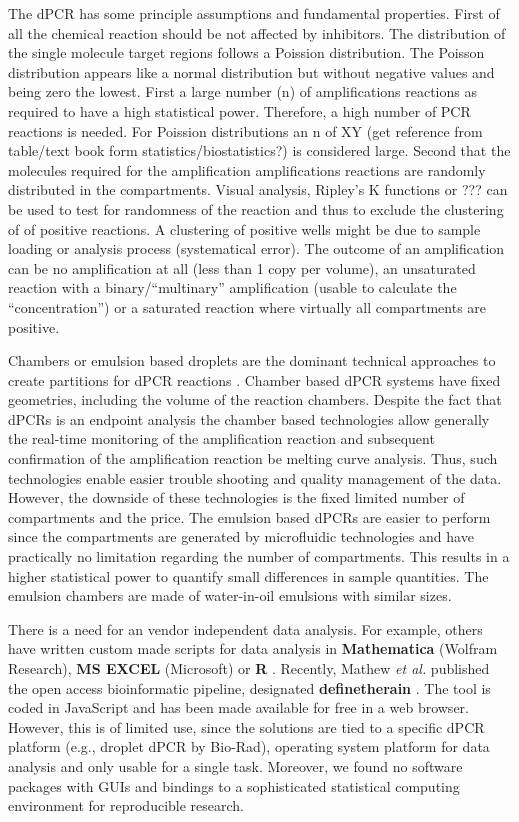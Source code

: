 \documentclass[a4,center,fleqn]{NAR}
\begin{document}
The dPCR has some principle assumptions and fundamental properties. First of all 
the chemical reaction should be not affected by inhibitors. The distribution of 
the single molecule target regions follows a Poission distribution. The Poisson 
distribution appears like a normal distribution but without negative values and 
being zero the lowest. First a large number (n) of amplifications reactions as 
required to have a high statistical power. Therefore, a 
high number of PCR reactions is needed. For Poission distributions an n of XY 
(get reference from table/text book form statistics/biostatistics?) is 
considered large. Second that the molecules required for the amplification 
amplifications reactions are randomly distributed in the compartments. Visual 
analysis, Ripley's K functions or ??? can be used to test for randomness of the 
reaction and thus to exclude the clustering of of positive reactions. A 
clustering of positive wells might be due to sample loading or analysis process 
(systematical error). The outcome of an amplification can be no amplification at 
all (less than 1 copy per volume), an unsaturated reaction with a 
binary/``multinary'' amplification (usable to calculate the ``concentration'') 
or a saturated reaction where virtually all compartments are positive.

Chambers or emulsion based droplets are the dominant technical approaches to 
create partitions for dPCR  reactions \cite{morley_digital_2014}. Chamber based 
dPCR systems have fixed geometries, including the volume of the reaction 
chambers. Despite the fact that dPCRs is an endpoint analysis the chamber based 
technologies allow generally the real-time monitoring of the amplification 
reaction and subsequent confirmation of the amplification reaction be melting 
curve analysis. Thus, such technologies enable easier trouble shooting and 
quality management of the data. However, the downside of these technologies is 
the fixed limited number of compartments and the price. The emulsion based dPCRs 
are easier to perform since the compartments are generated by microfluidic 
technologies and have practically no limitation regarding the number of 
compartments. This results in a higher statistical power to quantify small 
differences in sample quantities. The emulsion chambers are made of water-in-oil 
emulsions with similar sizes.

There is a need for an vendor independent data analysis. For example, others 
have written custom made scripts for data analysis in \textbf{Mathematica} 
(Wolfram Research), \textbf{MS EXCEL} (Microsoft) or \textbf{R} 
\cite{strain_highly_2013, dreo_optimising_2014, trypsteen_ddpcrquant_2015, 
dobnik_multiplex_2015}. Recently, Mathew \textit{et al.} published the open 
access bioinformatic pipeline, designated \textbf{definetherain} 
\cite{jones_low_2014}. The tool is coded in JavaScript and has been made 
available for free in a web browser. However, this is of limited use, since the 
solutions are tied to a specific dPCR platform (e.g., droplet dPCR by Bio-Rad), 
operating system platform for data analysis and only usable for a single task. 
Moreover, we found no software packages with GUIs and bindings to a 
sophisticated statistical computing environment for reproducible research. 
\end{document}
